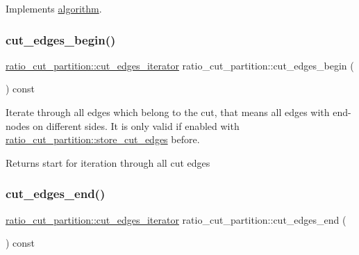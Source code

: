 Implements \mbox{\hyperlink{classalgorithm_a76361fb03ad1cf643affc51821e43bed}{algorithm}}.

\mbox{\label{classratio__cut__partition_a657a1d77b3b39037a52e6688674ad760}} 
\subsubsection{\texorpdfstring{cut\+\_\+edges\+\_\+begin()}{cut\_edges\_begin()}}
{\footnotesize\ttfamily \mbox{\hyperlink{classratio__cut__partition_a5269af60e49810067411b085a1341adc}{ratio\+\_\+cut\+\_\+partition\+::cut\+\_\+edges\+\_\+iterator}} ratio\+\_\+cut\+\_\+partition\+::cut\+\_\+edges\+\_\+begin (\begin{DoxyParamCaption}{ }\end{DoxyParamCaption}) const}

Iterate through all edges which belong to the cut, that means all edges with end-\/nodes on different sides. It is only valid if enabled with \mbox{\hyperlink{classratio__cut__partition_af5a76fa0ecaf2c75792cc2c1574994c7}{ratio\+\_\+cut\+\_\+partition\+::store\+\_\+cut\+\_\+edges}} before.

\begin{DoxyReturn}{Returns}
start for iteration through all cut edges 
\end{DoxyReturn}
\mbox{\label{classratio__cut__partition_a8609d76a4d74cb3b2596ac370c839fce}} 
\subsubsection{\texorpdfstring{cut\+\_\+edges\+\_\+end()}{cut\_edges\_end()}}
{\footnotesize\ttfamily \mbox{\hyperlink{classratio__cut__partition_a5269af60e49810067411b085a1341adc}{ratio\+\_\+cut\+\_\+partition\+::cut\+\_\+edges\+\_\+iterator}} ratio\+\_\+cut\+\_\+partition\+::cut\+\_\+edges\+\_\+end (\begin{DoxyParamCaption}{ }\end{DoxyParamCaption}) const}


